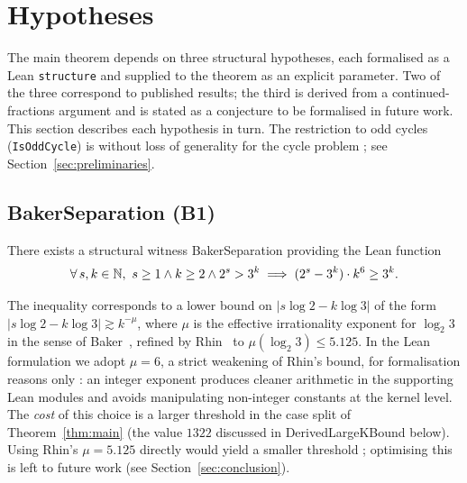 
\section{Hypotheses}
\label{sec:hypotheses}

The main theorem depends on three structural hypotheses, each formalised
as a Lean \texttt{structure} and supplied to the theorem as an explicit
parameter. Two of the three correspond to published results; the third is
derived from a continued-fractions argument and is stated as a conjecture
to be formalised in future work. This section describes each hypothesis
in turn. The restriction to odd cycles (\texttt{IsOddCycle}) is without
loss of generality for the cycle problem ; see Section~\ref{sec:preliminaries}.

\subsection{\textsf{BakerSeparation} (B1)}

\begin{hypothesis}\label{hyp:baker}
There exists a structural witness \textsf{BakerSeparation} providing the
Lean function
\[
\forall\, s, k \in \mathbb{N},\ s \geq 1 \wedge k \geq 2 \wedge 2^s > 3^k \;\Longrightarrow\;
(2^s - 3^k) \cdot k^6 \geq 3^k .
\]
\end{hypothesis}


The inequality corresponds to a lower bound on \(|s \log 2 - k \log 3|\)
of the form \(|s \log 2 - k \log 3| \gtrsim k^{-\mu}\), where
\(\mu\) is the effective irrationality exponent for \(\log_2 3\) in the
sense of Baker~\cite{Baker1966}, refined by Rhin~\cite{Rhin1987} to
\(\mu(\log_2 3) \leq 5.125\). In the Lean formulation we adopt
\(\mu = 6\), a strict weakening of Rhin's bound, for formalisation
reasons only : an integer exponent produces cleaner arithmetic in the
supporting Lean modules and avoids manipulating non-integer constants
at the kernel level. The \emph{cost} of this choice is a larger
threshold in the case split of Theorem~\ref{thm:main} (the value
\(1322\) discussed in \textsf{DerivedLargeKBound} below). Using Rhin's
\(\mu = 5.125\) directly would yield a smaller threshold ; optimising
this is left to future work (see Section~\ref{sec:conclusion}).

